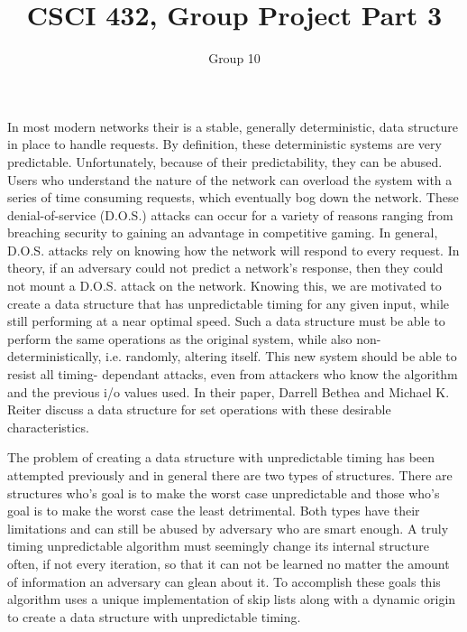 \documentclass[10pt]{article}
\title{CSCI 432, Group Project Part 3}
\author{Group 10}
\begin{document}
\maketitle



In most modern networks their is a stable, generally deterministic, data
structure in place to handle requests. By definition, these
deterministic systems are very predictable. Unfortunately, because of their
predictability, they can be abused. Users who understand the nature of 
the network can overload the system with a series of time consuming
requests, which eventually bog down the network. These denial-of-service
(D.O.S.) attacks can occur for a variety of reasons ranging from 
breaching security to gaining an advantage in competitive gaming. In 
general, D.O.S. attacks rely on knowing how the network will respond to 
every request. In theory, if an adversary could not predict a network's 
response, then they could not mount a D.O.S. attack on the network. 
Knowing this, we are motivated to 
create a data structure that has unpredictable timing 
for any given input, while still performing at a near optimal speed. 
Such a data structure must be able to perform the same operations as 
the original system, while also non-deterministically, i.e. randomly, 
altering itself. This new system should be able to resist all timing-
dependant attacks,
even from attackers who know the algorithm and the previous i/o values used.
In their paper, Darrell Bethea and Michael K. Reiter discuss a data
structure for set operations with these desirable characteristics\cite{Bethea09}.

The problem of creating a data structure with unpredictable timing has been 
attempted previously and in general there are two types of structures.
There are structures who's goal is to make the worst case unpredictable and 
those who's goal is to make the worst case the least detrimental. Both types 
have their limitations and can still be abused by adversary who are smart enough.
A truly timing unpredictable algorithm must seemingly change its internal 
structure often, if not every iteration, so that it can not be learned no 
matter the amount of information an adversary can glean about it. 
To accomplish these goals this algorithm uses a unique implementation of skip 
lists along with a dynamic origin to create a data structure with unpredictable timing.
\end{document}
